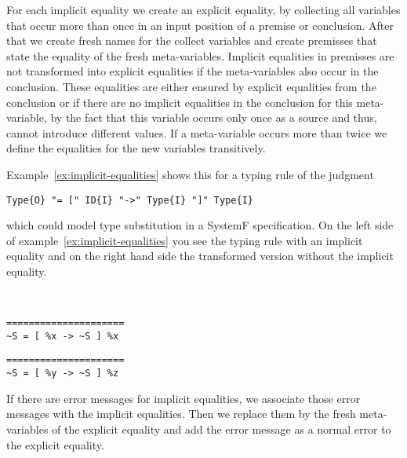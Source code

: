 For each implicit equality we create an explicit equality, by
collecting all variables that occur more than once in an input
position of a premise or conclusion. After that we create fresh names
for the collect variables and create premisses that state the equality
of the fresh meta-variables. Implicit equalities in premisses are not
transformed into explicit equalities if the meta-variables also occur
in the conclusion. These equalities are either ensured by explicit
equalities from the conclusion or if there are no implicit equalities
in the conclusion for this meta-variable, by the fact that this
variable occurs only once as a source and thus, cannot introduce
different values. If a meta-variable occurs more than twice we define
the equalities for the new variables transitively.

Example~\ref{ex:implicit-equalities} shows this for
a typing rule of the judgment

\begin{lstlisting}[language=sltc]
Type{O} "= [" ID{I} "->" Type{I} "]" Type{I}
\end{lstlisting}

which could model type substitution in a SystemF specification. On the
left side of example~\ref{ex:implicit-equalities} you see the typing
rule with an implicit equality and on the right hand side the
transformed version without the implicit equality.

\begin{example}{~}
\newline
  \begin{minipage}[b]{.45\linewidth}
    \begin{lstlisting}[language=sltc]
=====================
~S = [ %x -> ~S ] %x
\end{lstlisting}
  \end{minipage}
  \begin{minipage}[b]{.45\linewidth}
    \begin{lstlisting}[language=sltc]
%y = %z
=====================
~S = [ %y -> ~S ] %z
\end{lstlisting}
  \end{minipage}
\label{ex:implicit-equalities}
\end{example}

If there are error messages for implicit equalities, we associate
those error messages with the implicit equalities. Then we replace them
by the fresh meta-variables of the explicit equality and add the error
message as a normal error to the explicit equality.


